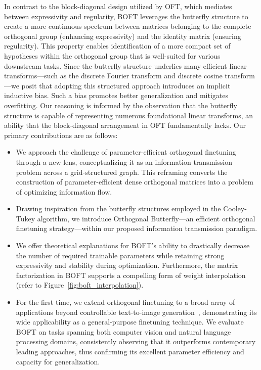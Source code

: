 In contrast to the block-diagonal design utilized by OFT, which mediates between expressivity and regularity, BOFT leverages the butterfly structure to create a more continuous spectrum between matrices belonging to the complete orthogonal group (enhancing expressivity) and the identity matrix (ensuring regularity). This property enables identification of a more compact set of hypotheses within the orthogonal group that is well-suited for various downstream tasks. Since the butterfly structure underlies many efficient linear transforms—such as the discrete Fourier transform and discrete cosine transform—we posit that adopting this structured approach introduces an implicit inductive bias. Such a bias promotes better generalization and mitigates overfitting. Our reasoning is informed by the observation that the butterfly structure is capable of representing numerous foundational linear transforms, an ability that the block-diagonal arrangement in OFT fundamentally lacks. Our primary contributions are as follows:

\begin{itemize}[leftmargin=*,nosep]
    \item We approach the challenge of parameter-efficient orthogonal finetuning through a new lens, conceptualizing it as an information transmission problem across a grid-structured graph. This reframing converts the construction of parameter-efficient dense orthogonal matrices into a problem of optimizing information flow.
    \item Drawing inspiration from the butterfly structures employed in the Cooley-Tukey algorithm, we introduce Orthogonal Butterfly—an efficient orthogonal finetuning strategy—within our proposed information transmission paradigm.
    \item We offer theoretical explanations for BOFT's ability to drastically decrease the number of required trainable parameters while retaining strong expressivity and stability during optimization. Furthermore, the matrix factorization in BOFT supports a compelling form of weight interpolation (refer to Figure~\ref{fig:boft_interpolation}).
    \item For the first time, we extend orthogonal finetuning to a broad array of applications beyond controllable text-to-image generation~\cite{qiu2023controlling}, demonstrating its wide applicability as a general-purpose finetuning technique. We evaluate BOFT on tasks spanning both computer vision and natural language processing domains, consistently observing that it outperforms contemporary leading approaches, thus confirming its excellent parameter efficiency and capacity for generalization.
\end{itemize}

